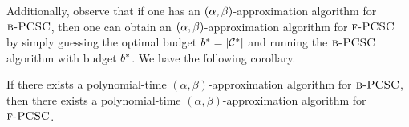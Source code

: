 
Additionally, observe that if one has an $\mathopen{}\left( \alpha, \beta \right)$-approximation algorithm for $\textup{\textsc{b-PCSC}}$, then one can obtain an $\mathopen{}\left( \alpha, \beta \right)$-approximation algorithm for $\textup{\textsc{f-PCSC}}$ by simply guessing the optimal budget $b^*=\mathopen{}\left| \mathcal{C}^{*} \right|$ and running the $\textup{\textsc{b-PCSC}}$ algorithm with budget $b^*$. We have the following corollary.
\begin{corollary}\label{ea:cor:BPCSC-to-PCSC}
    If there exists a polynomial-time $(\alpha,\beta)$-approximation algorithm for $\textup{\textsc{b-PCSC}}$, then there exists a polynomial-time $(\alpha,\beta)$-approximation algorithm for $\textup{\textsc{f-PCSC}}$.
\end{corollary}



